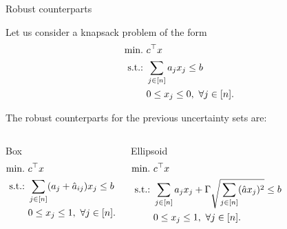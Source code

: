 \begin{frame}{Robust counterparts}

	Let us consider a knapsack problem of the form
	\begin{equation*}
	\begin{aligned}
		\mathop{\text{min.} \ } & c^\top x \\		
		\text{s.t.:~} & \sum_{j \in [n]} a_j x_j \le b \\
		& 0 \le x_j \le 0, \ \forall j \in [n].
	\end{aligned}
	\end{equation*}
	
	\pause
	The \alert{robust counterparts} for the previous uncertainty sets are:
	\begin{columns}
		\begin{block}{Box}
			\vspace{-12pt}
			\begin{equation*}
			\begin{aligned}
				\mathop{\text{min.} \ } & c^\top x \\		
				\text{s.t.:~} & \sum_{j \in [n]} (a_j + \hat{a}_{ij})x_j \le b \\
				& 0 \le x_j \le 1, \ \forall j \in [n].
			\end{aligned}
			\end{equation*}
		\end{block}
		\begin{block}{Ellipsoid}
			\vspace{-12pt}
			\begin{equation*}
			\begin{aligned}
				\mathop{\text{min.} \ } & c^\top x \\		
				\text{s.t.:~} & \sum_{j \in [n]} a_j x_j + \Gamma\sqrt{\sum_{j \in [n]} (\hat{a} x_j)^2} \le b \\
				& 0 \le x_j \le 1, \ \forall j \in [n].
			\end{aligned}
			\end{equation*}
		\end{block}
	\end{columns}

\end{frame}


